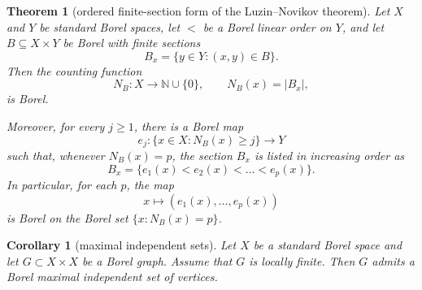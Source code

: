 \documentclass[10pt,a4paper]{amsart}
\newtheorem{corollary}{Corollary}
\newtheorem{theorem}{Theorem}
\newcommand{\bN}{\mathbb N}
\begin{document}
\begin{theorem}[ordered finite-section form of the Luzin--Novikov theorem]\label{thm:L-N-ordered}
Let $X$ and $Y$ be standard Borel spaces, let $<$ be a Borel linear order on $Y$, and let
$B\subseteq X\times Y$ be Borel with finite sections
\[
B_x=\{y\in Y\colon (x,y)\in B\}.
\]
Then the counting function
\[
N_B\colon X\to\bN \cup \{0\},\qquad N_B(x)=|B_x|,
\]
is Borel.

Moreover, for every $j\ge1$, there is a Borel map
\[
e_j\colon \{x\in X\colon N_B(x)\ge j\}\to Y
\]
such that, whenever $N_B(x)=p$, the section $B_x$ is listed in increasing order as
\[
B_x=\{e_1(x)<e_2(x)<\ldots<e_p(x)\}.
\]
In particular, for each $p$, the map
\[
x\mapsto (e_1(x),\ldots,e_p(x))
\]
is Borel on the Borel set $\{x\colon N_B(x)=p\}$.
\end{theorem}

\begin{corollary}[maximal independent sets]\label{cor:indep_sets}
Let $X$ be a standard Borel space and let $G\subset X\times X$ be a Borel graph. Assume that
$G$ is locally finite. Then $G$ admits a Borel maximal independent set of vertices.
\end{corollary}
\end{document}
